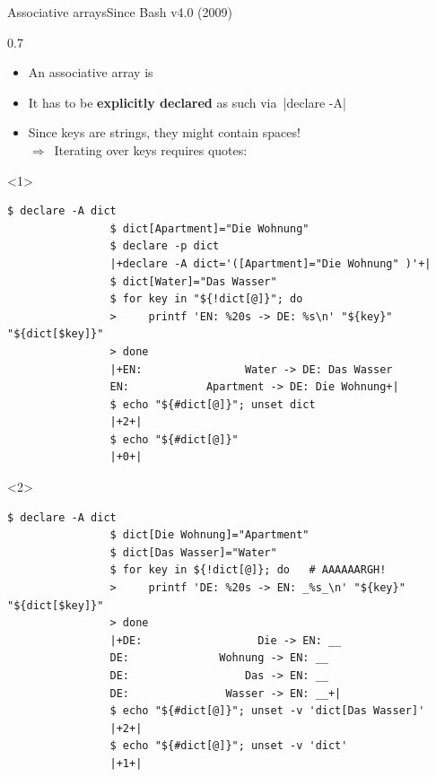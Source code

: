 \begin{frame}[fragile]{Associative arrays}{Since Bash v4.0 (2009)}
    \begin{overlayarea}{\textwidth}{0.7\textheight}
        \begin{itemize}
            \item An associative array is 
            \item It has to be \textbf{explicitly declared} as such via \,\bash|declare -A|
            \item Since keys are strings, they might contain spaces!\\
                  $\Rightarrow\,$ Iterating over keys requires quotes: 
        \end{itemize}
        \begin{onlyenv}<1>
            \begin{lstlisting}[style=MyBash, xrightmargin=1mm]
                $ declare -A dict
                $ dict[Apartment]="Die Wohnung"
                $ declare -p dict
                |+declare -A dict='([Apartment]="Die Wohnung" )'+|
                $ dict[Water]="Das Wasser"
                $ for key in "${!dict[@]}"; do
                >     printf 'EN: %20s -> DE: %s\n' "${key}" "${dict[$key]}"
                > done
                |+EN:                Water -> DE: Das Wasser
                EN:            Apartment -> DE: Die Wohnung+|
                $ echo "${#dict[@]}"; unset dict
                |+2+|
                $ echo "${#dict[@]}"
                |+0+|
            \end{lstlisting}
        \end{onlyenv}
        \begin{onlyenv}<2>
            \begin{lstlisting}[style=MyBash, firstnumber=15, xrightmargin=1mm]
                $ declare -A dict
                $ dict[Die Wohnung]="Apartment"
                $ dict[Das Wasser]="Water"
                $ for key in ${!dict[@]}; do   # AAAAAARGH!
                >     printf 'DE: %20s -> EN: _%s_\n' "${key}" "${dict[$key]}"
                > done
                |+DE:                  Die -> EN: __
                DE:              Wohnung -> EN: __
                DE:                  Das -> EN: __
                DE:               Wasser -> EN: __+|
                $ echo "${#dict[@]}"; unset -v 'dict[Das Wasser]'
                |+2+|
                $ echo "${#dict[@]}"; unset -v 'dict'
                |+1+|
            \end{lstlisting}
        \end{onlyenv}
    \end{overlayarea}
\end{frame}
